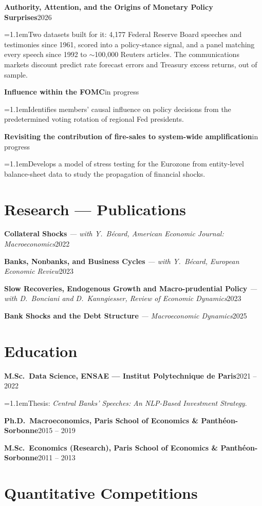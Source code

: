 \documentclass[10pt,a4paper]{article}
\newcommand{\job}[3]{%
  \textbf{#1}\hfill #2\par\nobreak
  {\leftskip=1.1em\small #3\par}%
  \vspace{2.5pt}%
}
\newcommand{\jobplain}[2]{%
  \textbf{#1}\hfill #2\par
  \vspace{2.5pt}%
}
\newcommand{\publine}[3]{%
  {\textbf{#1} {\small\textit{#2}}\hfill #3\par}\vspace{2pt}%
}
\begin{document}
\job{Authority, Attention, and the Origins of Monetary Policy Surprises}{2026}
{Two datasets built for it: 4{,}177 Federal Reserve Board speeches and testimonies
since 1961, scored into a policy-stance signal, and a panel matching every speech since 1992 to
$\sim$100{,}000 Reuters articles. The communications markets discount predict rate forecast
errors and Treasury excess returns, out of sample.}

\job{Influence within the FOMC}{in progress}
{Identifies members' causal influence on policy decisions from the predetermined voting rotation of
regional Fed presidents.}

\job{Revisiting the contribution of fire-sales to system-wide amplification}{in progress}
{Develops a model of stress testing for the Eurozone from entity-level balance-sheet data to study the propagation of financial shocks.}
\section{Research --- Publications}

\publine{Collateral Shocks}{--- with Y.\ B\'ecard, American Economic Journal: Macroeconomics}{2022}
\publine{Banks, Nonbanks, and Business Cycles}{--- with Y.\ B\'ecard, European Economic Review}{2023}
\publine{Slow Recoveries, Endogenous Growth and Macro-prudential Policy}{--- with D.\ Bonciani and D.\ Kanngiesser, Review of Economic Dynamics}{2023}
\publine{Bank Shocks and the Debt Structure}{--- Macroeconomic Dynamics}{2025}

\section{Education}

\job{M.Sc.\ Data Science, ENSAE --- Institut Polytechnique de Paris}{2021 -- 2022}
{Thesis: \textit{Central Banks' Speeches: An NLP-Based Investment Strategy}.}

\jobplain{Ph.D.\ Macroeconomics, Paris School of Economics \& Panth\'eon-Sorbonne}{2015 -- 2019}

\jobplain{M.Sc.\ Economics (Research), Paris School of Economics \& Panth\'eon-Sorbonne}{2011 -- 2013}

\section{Quantitative Competitions}
\end{document}
